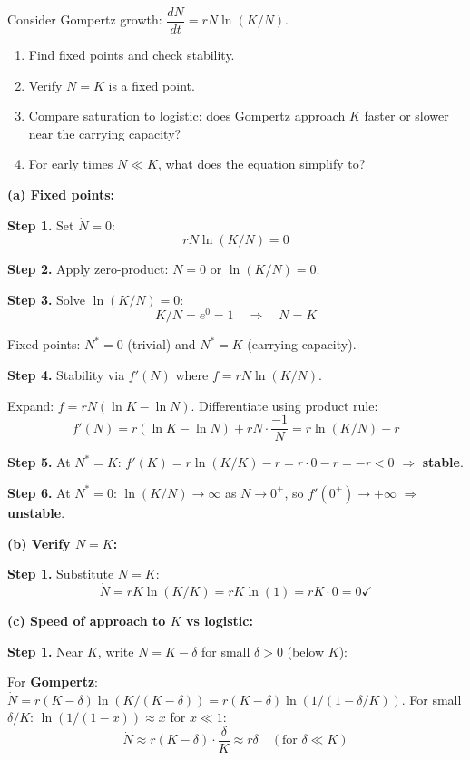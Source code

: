 \documentclass[10pt]{article}
\newcommand{\thus}{\quad\Longrightarrow\quad}
\begin{document}
\begin{problem}
Consider Gompertz growth: $\dfrac{dN}{dt} = rN\ln(K/N)$.
\begin{enumerate}[label=(\alph*)]
\item Find fixed points and check stability.
\item Verify $N=K$ is a fixed point.
\item Compare saturation to logistic: does Gompertz approach $K$ faster or slower near the carrying capacity?
\item For early times $N \ll K$, what does the equation simplify to?
\end{enumerate}
\end{problem}

\begin{solution}
\textbf{(a) Fixed points:}

\textbf{Step 1.} Set $\dot N = 0$:
\[
rN\ln(K/N) = 0
\]

\textbf{Step 2.} Apply zero-product: $N = 0$ or $\ln(K/N) = 0$.

\textbf{Step 3.} Solve $\ln(K/N) = 0$:
\[
K/N = e^0 = 1 \thus N = K
\]

Fixed points: $N^* = 0$ (trivial) and $N^* = K$ (carrying capacity).

\textbf{Step 4.} Stability via $f'(N)$ where $f = rN\ln(K/N)$.

Expand: $f = rN(\ln K - \ln N)$. Differentiate using product rule:
\[
f'(N) = r(\ln K - \ln N) + rN\cdot\frac{-1}{N} = r\ln(K/N) - r
\]

\textbf{Step 5.} At $N^* = K$: $f'(K) = r\ln(K/K) - r = r\cdot 0 - r = -r < 0$ $\Rightarrow$ \textbf{stable}.

\textbf{Step 6.} At $N^* = 0$: $\ln(K/N) \to \infty$ as $N\to 0^+$, so $f'(0^+) \to +\infty$ $\Rightarrow$ \textbf{unstable}.

\medskip\textbf{(b) Verify $N=K$:}

\textbf{Step 1.} Substitute $N = K$:
\[
\dot N = rK\ln(K/K) = rK\ln(1) = rK\cdot 0 = 0 \checkmark
\]

\medskip\textbf{(c) Speed of approach to $K$ vs logistic:}

\textbf{Step 1.} Near $K$, write $N = K - \delta$ for small $\delta > 0$ (below $K$):

For \textbf{Gompertz}: $\dot N = r(K-\delta)\ln(K/(K-\delta)) = r(K-\delta)\ln(1/(1-\delta/K))$.
For small $\delta/K$: $\ln(1/(1-x)) \approx x$ for $x \ll 1$:
\[
\dot N \approx r(K-\delta)\cdot\frac{\delta}{K} \approx r\delta \quad(\text{for }\delta \ll K)
\]


\end{solution}
\end{document}
